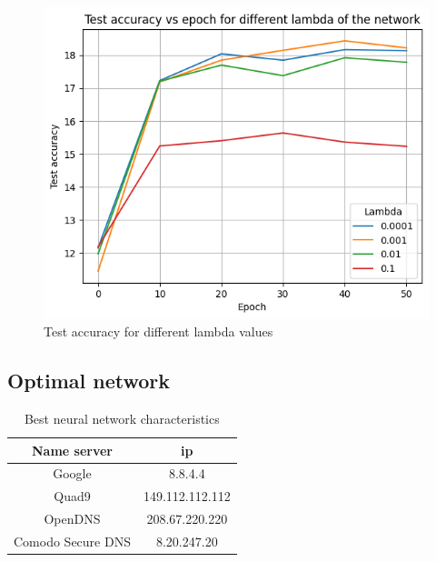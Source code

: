 \documentclass[eng]{class}
\begin{document}
\begin{figure}[h]
  \centering
  \includegraphics[width=.8\columnwidth]{images/lamda.png}
  \caption{Test accuracy for different lambda values}
  \label{fig-4}
\end{figure}
\subsection{Optimal network}
\begin{table}[H]
  \centering
  \begin{tabular}{|c|c|}
    \hline
    \linewidth=0cm
    Name server       & ip              \\
    \hline
    Google            & 8.8.4.4         \\
    Quad9             & 149.112.112.112 \\
    OpenDNS           & 208.67.220.220  \\
    Comodo Secure DNS & 8.20.247.20     \\
    \hline
  \end{tabular}
  \caption{Best neural network characteristics}
  \label{tab-1}
\end{table}
\end{document}
